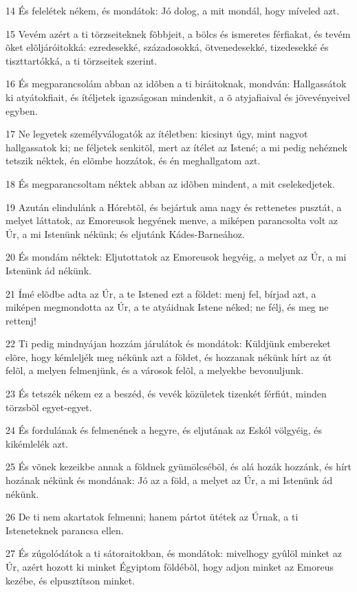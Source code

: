 \par 14 És felelétek nékem, és mondátok: Jó dolog, a mit mondál, hogy míveled azt.
\par 15 Vevém azért a ti törzseiteknek fõbbjeit, a bölcs és ismeretes férfiakat, és tevém õket elõljáróitokká: ezredesekké, századosokká, ötvenedesekké, tizedesekké és tiszttartókká, a ti törzseitek szerint.
\par 16 És megparancsolám abban az idõben a ti biráitoknak, mondván: Hallgassátok ki atyátokfiait, és ítéljetek igazságosan mindenkit, a õ atyjafiaival és jövevényeivel egyben.
\par 17 Ne legyetek személyválogatók az ítéletben: kicsinyt úgy, mint nagyot hallgassatok ki; ne féljetek senkitõl, mert az ítélet az Istené; a mi pedig nehéznek tetszik néktek, én elõmbe hozzátok, és én meghallgatom azt.
\par 18 És megparancsoltam néktek abban az idõben mindent, a mit cselekedjetek.
\par 19 Azután elindulánk a Hórebtõl, és bejártuk ama nagy és rettenetes pusztát, a melyet láttatok, az Emoreusok hegyének menve, a miképen parancsolta volt az Úr, a mi Istenünk nékünk; és eljutánk Kádes-Barneához.
\par 20 És mondám néktek: Eljutottatok az Emoreusok hegyéig, a melyet az Úr, a mi Istenünk ád nékünk.
\par 21 Ímé elõdbe adta az Úr, a te Istened ezt a földet: menj fel, bírjad azt, a miképen megmondotta az Úr, a te atyáidnak Istene néked; ne félj, és meg ne rettenj!
\par 22 Ti pedig mindnyájan hozzám járulátok és mondátok: Küldjünk embereket elõre, hogy kémleljék meg nékünk azt a földet, és hozzanak nékünk hírt az út felõl, a melyen felmenjünk, és a városok felõl, a melyekbe bevonuljunk.
\par 23 És tetszék nékem ez a beszéd, és vevék közületek tizenkét férfiút, minden törzsbõl egyet-egyet.
\par 24 És fordulának és felmenének a hegyre, és eljutának az Eskól völgyéig, és kikémlelék azt.
\par 25 És võnek kezeikbe annak a földnek gyümölcsébõl, és alá hozák hozzánk, és hírt hozának nékünk és mondának: Jó az a föld, a melyet az Úr, a mi Istenünk ád nékünk.
\par 26 De ti nem akartatok felmenni; hanem pártot ütétek az Úrnak, a ti Isteneteknek parancsa ellen.
\par 27 És zúgolódátok a ti sátoraitokban, és mondátok: mivelhogy gyûlöl minket az Úr, azért hozott ki minket Égyiptom földébõl, hogy adjon minket az Emoreus kezébe, és elpusztítson minket.
